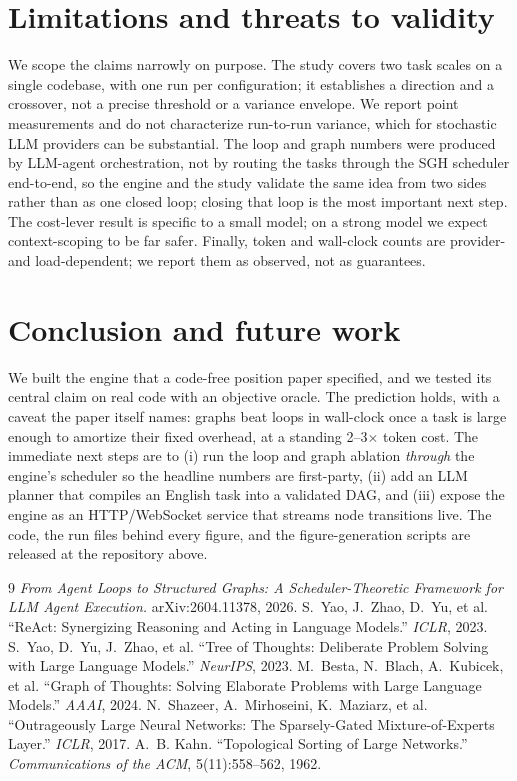 \documentclass[11pt]{article}
\begin{document}
\section{Limitations and threats to validity}
\label{sec:limits}
We scope the claims narrowly on purpose. The study covers two task scales on a single codebase,
with one run per configuration; it establishes a direction and a crossover, not a precise threshold
or a variance envelope. We report point measurements and do not characterize run-to-run variance,
which for stochastic LLM providers can be substantial. The loop and graph numbers were produced by
LLM-agent orchestration, not by routing the tasks through the SGH scheduler end-to-end, so the
engine and the study validate the same idea from two sides rather than as one closed loop; closing
that loop is the most important next step. The cost-lever result is specific to a small model; on a
strong model we expect context-scoping to be far safer. Finally, token and wall-clock counts are
provider- and load-dependent; we report them as observed, not as guarantees.

\section{Conclusion and future work}
We built the engine that a code-free position paper specified, and we tested its central claim on
real code with an objective oracle. The prediction holds, with a caveat the paper itself names: graphs
beat loops in wall-clock once a task is large enough to amortize their fixed overhead, at a standing
2--3$\times$ token cost. The immediate next steps are to (i) run the loop and graph ablation
\emph{through} the engine's scheduler so the headline numbers are first-party, (ii) add an LLM
planner that compiles an English task into a validated DAG, and (iii) expose the engine as an
HTTP/WebSocket service that streams node transitions live. The code, the run files behind every
figure, and the figure-generation scripts are released at the repository above.

\begin{thebibliography}{9}
\small
{} \emph{From Agent Loops to Structured Graphs: A Scheduler-Theoretic Framework for
LLM Agent Execution.} arXiv:2604.11378, 2026.
 S.~Yao, J.~Zhao, D.~Yu, et al. ``ReAct: Synergizing Reasoning and Acting in
Language Models.'' \emph{ICLR}, 2023.
 S.~Yao, D.~Yu, J.~Zhao, et al. ``Tree of Thoughts: Deliberate Problem Solving with
Large Language Models.'' \emph{NeurIPS}, 2023.
 M.~Besta, N.~Blach, A.~Kubicek, et al. ``Graph of Thoughts: Solving Elaborate
Problems with Large Language Models.'' \emph{AAAI}, 2024.
 N.~Shazeer, A.~Mirhoseini, K.~Maziarz, et al. ``Outrageously Large Neural Networks:
The Sparsely-Gated Mixture-of-Experts Layer.'' \emph{ICLR}, 2017.
 A.~B. Kahn. ``Topological Sorting of Large Networks.'' \emph{Communications of the
ACM}, 5(11):558--562, 1962.
\end{thebibliography}
\end{document}
